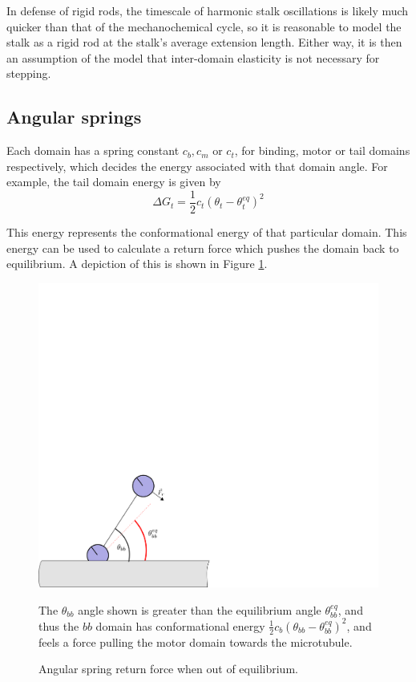 \documentclass[
11pt, %
english, %
singlespacing, %
headsepline, %
chapterinoneline, %
]{MastersDoctoralThesis} %
\begin{document}
In defense of rigid rods, the timescale of harmonic stalk oscillations is likely much quicker than that of the mechanochemical cycle, so it is reasonable to model the stalk as a rigid rod at the stalk's average extension length. Either way, it is then an assumption of the model that inter-domain elasticity is not necessary for stepping.\\

\subsection{Angular springs}
Each domain has a spring constant $c_b, c_m$ or $c_t$, for binding, motor or tail domains respectively, which decides the energy associated with that domain angle. For example, the tail domain energy is given by
%
\begin{equation}
  \Delta G_t = \frac12c_t\left(\theta_t - \theta_t^{eq}\right)^2
\end{equation}

This energy represents the conformational energy of that particular domain. This energy can be used to calculate a return force which pushes the domain back to equilibrium. A depiction of this is shown in Figure \ref{fig:angular-spring}.\\

\begin{figure}[h]
  \centering
  \includegraphics[width=.65\textwidth]{../../figures/angular-spring}
  \caption{Angular spring return force when out of equilibrium.}{The $\theta_{bb}$ angle shown is greater than the equilibrium angle $\theta_{bb}^{eq}$, and thus the $bb$ domain has conformational energy $\frac{1}{2}c_b\left(\theta_{bb}-\theta_{bb}^{eq}\right)^2$, and feels a force pulling the motor domain towards the microtubule.}
  \label{fig:angular-spring}
\end{figure}
\end{document}
